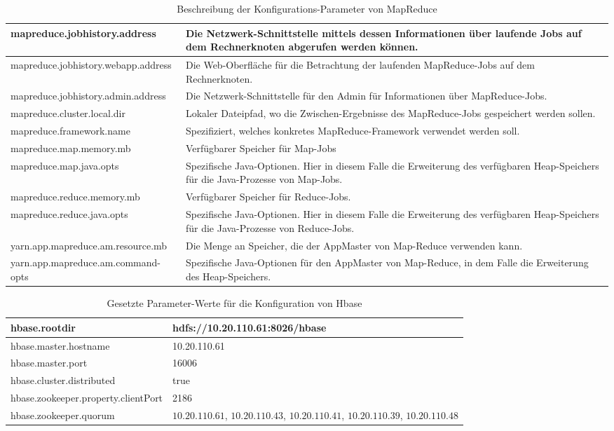 \begin{appendices}
\begin{table}
	\begin{tabularx}{\textwidth}{| X | X |} \hline
	mapreduce.jobhistory.address & Die Netzwerk-Schnittstelle mittels dessen Informationen
	über laufende Jobs auf dem Rechnerknoten abgerufen werden können. \\ \hline
	mapreduce.jobhistory.webapp.address & Die Web-Oberfläche für die Betrachtung
	der laufenden MapReduce-Jobs auf dem Rechnerknoten.\\ \hline
	mapreduce.jobhistory.admin.address & Die Netzwerk-Schnittstelle für den Admin für
	Informationen über MapReduce-Jobs.\\ \hline
	mapreduce.cluster.local.dir &  Lokaler Dateipfad, wo die Zwischen-Ergebnisse des MapReduce-Jobs gespeichert werden sollen.\\ \hline
	mapreduce.framework.name &  Spezifiziert, welches konkretes MapReduce-Framework
	verwendet werden soll. \\ \hline
	mapreduce.map.memory.mb &  Verfügbarer Speicher für Map-Jobs\\ \hline
	mapreduce.map.java.opts & Spezifische Java-Optionen. Hier in diesem Falle die Erweiterung
	des verfügbaren Heap-Speichers für die Java-Prozesse von Map-Jobs.\\ \hline
	mapreduce.reduce.memory.mb &  Verfügbarer Speicher für Reduce-Jobs.\\ \hline
	mapreduce.reduce.java.opts & Spezifische Java-Optionen. Hier in diesem Falle die Erweiterung
	des verfügbaren Heap-Speichers für die Java-Prozesse von Reduce-Jobs. \\ \hline
	yarn.app.mapreduce.am.resource.mb & Die Menge an Speicher, die der AppMaster von
	Map-Reduce verwenden kann. \\ \hline
	yarn.app.mapreduce.am.command-opts &  Spezifische Java-Optionen für den AppMaster
	von Map-Reduce, in dem Falle die Erweiterung des Heap-Speichers.\\ \hline
	\end{tabularx}
	\caption{Beschreibung der Konfigurations-Parameter von MapReduce}
	\label{config:mapreduceDescription}
\end{table}

\begin{table}
	\begin{tabularx}{\textwidth}{| X | X |} \hline
	hbase.rootdir & hdfs://10.20.110.61:8026/hbase \\ \hline
	hbase.master.hostname & 10.20.110.61 \\ \hline
	hbase.master.port & 16006 \\ \hline
	hbase.cluster.distributed & true \\ \hline
	hbase.zookeeper.property.clientPort & 2186 \\ \hline
	hbase.zookeeper.quorum & $10.20.110.61$, $10.20.110.43$, $10.20.110.41$, $10.20.110.39$, $10.20.110.48$ \\ \hline
	\end{tabularx}
	\caption{Gesetzte Parameter-Werte für die Konfiguration von Hbase}
	\label{config:hbaseValues}
\end{table}


\end{appendices}
